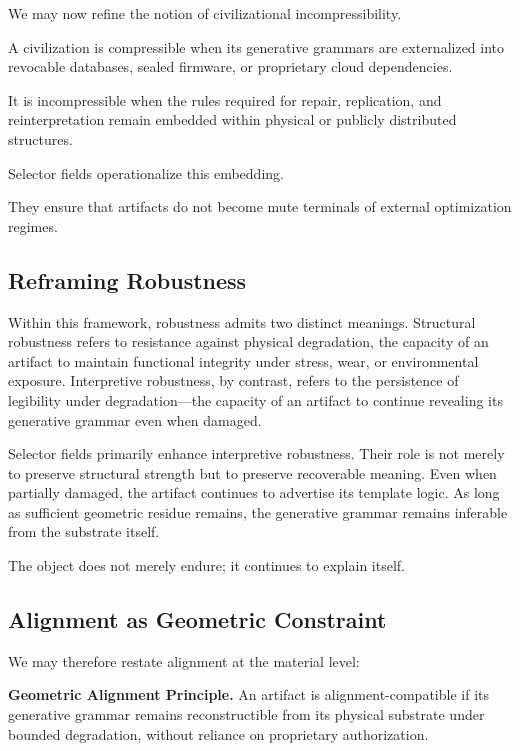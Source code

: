 \documentclass[11pt]{article}
\begin{document}
We may now refine the notion of civilizational incompressibility.

A civilization is compressible when its generative grammars are 
externalized into revocable databases, sealed firmware, or proprietary 
cloud dependencies.

It is incompressible when the rules required for repair, replication, 
and reinterpretation remain embedded within physical or publicly 
distributed structures.

Selector fields operationalize this embedding.

They ensure that artifacts do not become mute terminals of external 
optimization regimes.

\subsection{Reframing Robustness}

Within this framework, robustness admits two distinct meanings.
Structural robustness refers to resistance against physical degradation,
the capacity of an artifact to maintain functional integrity under
stress, wear, or environmental exposure. Interpretive robustness, by
contrast, refers to the persistence of legibility under degradation—the
capacity of an artifact to continue revealing its generative grammar even
when damaged.

Selector fields primarily enhance interpretive robustness. Their role is
not merely to preserve structural strength but to preserve recoverable
meaning. Even when partially damaged, the artifact continues to advertise
its template logic. As long as sufficient geometric residue remains, the
generative grammar remains inferable from the substrate itself.

The object does not merely endure; it continues to explain itself.

\subsection{Alignment as Geometric Constraint}

We may therefore restate alignment at the material level:

\medskip

\noindent
\textbf{Geometric Alignment Principle.}
An artifact is alignment-compatible if its generative grammar remains 
reconstructible from its physical substrate under bounded degradation, 
without reliance on proprietary authorization.
\end{document}

